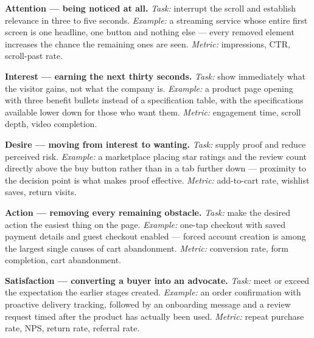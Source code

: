 \begin{qlist}
\begin{apts}
\item \textbf{Attention --- being noticed at all.} \emph{Task:} interrupt the
      scroll and establish relevance in three to five seconds. \emph{Example:} a
      streaming service whose entire first screen is one headline, one button
      and nothing else --- every removed element increases the chance the
      remaining ones are seen. \emph{Metric:} impressions, CTR, scroll-past
      rate.
\item \textbf{Interest --- earning the next thirty seconds.} \emph{Task:} show
      immediately what the visitor gains, not what the company is.
      \emph{Example:} a product page opening with three benefit bullets instead
      of a specification table, with the specifications available lower down for
      those who want them. \emph{Metric:} engagement time, scroll depth, video
      completion.
\item \textbf{Desire --- moving from interest to wanting.} \emph{Task:} supply
      proof and reduce perceived risk. \emph{Example:} a marketplace placing
      star ratings and the review count directly above the buy button rather
      than in a tab further down --- proximity to the decision point is what
      makes proof effective. \emph{Metric:} add-to-cart rate, wishlist saves,
      return visits.
\item \textbf{Action --- removing every remaining obstacle.} \emph{Task:} make
      the desired action the easiest thing on the page. \emph{Example:} one-tap
      checkout with saved payment details and guest checkout enabled --- forced
      account creation is among the largest single causes of cart abandonment.
      \emph{Metric:} conversion rate, form completion, cart abandonment.
\item \textbf{Satisfaction --- converting a buyer into an advocate.}
      \emph{Task:} meet or exceed the expectation the earlier stages created.
      \emph{Example:} an order confirmation with proactive delivery tracking,
      followed by an onboarding message and a review request timed after the
      product has actually been used. \emph{Metric:} repeat purchase rate, NPS,
      return rate, referral rate.
\end{apts}


\end{qlist}
